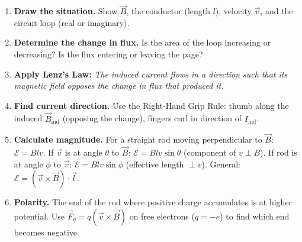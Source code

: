 \documentclass[11pt]{article}
\begin{document}
\begin{methode}[Applying Lenz's Law and Motional E.M.F. ($\mathcal{E} = Blv$)]
\begin{enumerate}
\item \textbf{Draw the situation.} Show $\vec{B}$, the conductor (length $l$), velocity $\vec{v}$, and the circuit loop (real or imaginary).
\item \textbf{Determine the change in flux.} Is the area of the loop increasing or decreasing? Is the flux entering or leaving the page?
\item \textbf{Apply Lenz's Law:} \emph{The induced current flows in a direction such that its magnetic field opposes the change in flux that produced it.}
\item \textbf{Find current direction.} Use the Right-Hand Grip Rule: thumb along the induced $\vec{B}_{\text{ind}}$ (opposing the change), fingers curl in direction of $I_{\text{ind}}$.
\item \textbf{Calculate magnitude.} For a straight rod moving perpendicular to $\vec{B}$: $\mathcal{E} = Blv$. If $\vec{v}$ is at angle $\theta$ to $\vec{B}$: $\mathcal{E} = Blv\sin\theta$ (component of $v \perp B$). If rod is at angle $\phi$ to $\vec{v}$: $\mathcal{E} = Blv\sin\phi$ (effective length $\perp v$). General: $\mathcal{E} = (\vec{v} \times \vec{B}) \cdot \vec{l}$.
\item \textbf{Polarity.} The end of the rod where positive charge accumulates is at higher potential. Use $\vec{F}_q = q(\vec{v} \times \vec{B})$ on free electrons ($q=-e$) to find which end becomes negative.
\end{enumerate}
\end{methode}
\end{document}
